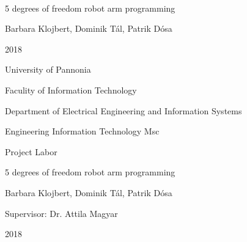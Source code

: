\begin{titlepage}
	\setlength{\hoffset}{0mm}
	\pagestyle{empty}
	\begin{center} 
		~\\
		\vspace{125pt}	
		\Large 
		5 degrees of freedom robot arm programming
		\vspace{200pt}
		
		\Large 
		Barbara Klojbert, Dominik Tál, Patrik Dósa
		\vspace{60pt}
		
		\Large 
		2018
	\end{center}
	
	\newpage
	
	\pagestyle{empty}
	
	\newpage
	\pagestyle{empty}
	\begin{center}
		\Large
		University of Pannonia
		
		\vspace{10mm}
		Faculity of Information Technology
		
		\vspace{10mm}
		Department of Electrical Engineering and Information Systems
		
		\vspace{10mm}
		Engineering Information Technology Msc
		
		\vspace{40mm}
		\huge
		Project Labor
		
		\vspace{10mm}
		\LARGE
		5 degrees of freedom robot arm programming
		
		\vspace{10mm}
		\Large
		Barbara Klojbert, Dominik Tál, Patrik Dósa
		
		\vspace{15mm}
		Supervisor: Dr. Attila Magyar
		
		\vspace{20mm}
		2018
		\normalsize
	\end{center}
\end{titlepage}

\setlength{\hoffset}{4mm}
\newpage